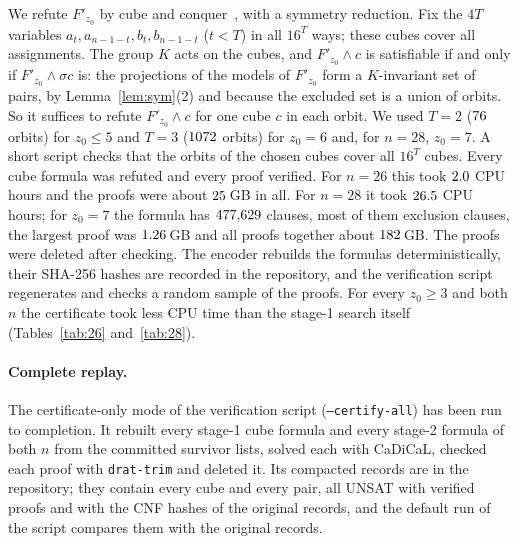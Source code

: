 \documentclass[11pt]{article}
\theoremstyle{definition}
\theoremstyle{remark}
\begin{document}
We refute $F'_{z_0}$ by cube and conquer~\cite{CubeConquer}, with a symmetry reduction. Fix the $4T$
variables $a_t,a_{n-1-t},b_t,b_{n-1-t}$ ($t<T$) in all $16^T$ ways; these cubes cover all assignments.
The group $K$ acts on the cubes, and $F'_{z_0}\wedge c$ is satisfiable if and only if
$F'_{z_0}\wedge\sigma c$ is: the projections of the models of $F'_{z_0}$ form a $K$-invariant set of
pairs, by Lemma~\ref{lem:sym}(2) and because the excluded set is a union of orbits. So it suffices to
refute $F'_{z_0}\wedge c$ for one cube $c$ in each orbit. We used $T=2$ ($76$ orbits) for
$z_0\le5$ and $T=3$ ($1072$ orbits) for $z_0=6$ and, for $n=28$, $z_0=7$. A short script checks
that the orbits of the chosen cubes cover all $16^T$ cubes. Every cube formula was refuted and every
proof verified. For $n=26$ this took $2.0$ CPU hours and the proofs were about $25$\,GB in
all. For $n=28$ it took $26.5$ CPU hours; for $z_0=7$ the formula has $477{,}629$
clauses, most of them exclusion clauses, the largest proof was $1.26$\,GB and all proofs
together about $182$\,GB. The proofs were deleted after checking. The encoder rebuilds the
formulas deterministically, their SHA-256 hashes are recorded in the repository, and the verification
script regenerates and checks a random sample of the proofs. For every $z_0\ge3$ and both $n$ the
certificate took less CPU time than the stage-1 search itself (Tables~\ref{tab:26} and~\ref{tab:28}).

\paragraph{Complete replay.} The certificate-only mode of the verification script
(\texttt{--certify-all}) has been run to completion. It rebuilt every stage-1 cube formula and every
stage-2 formula of both $n$ from the committed survivor lists, solved each with CaDiCaL, checked each proof
with \texttt{drat-trim} and deleted it. Its compacted records are in the repository; they contain every
cube and every pair, all UNSAT with verified proofs and with the CNF hashes of the original records, and
the default run of the script compares them with the original records.
\end{document}
